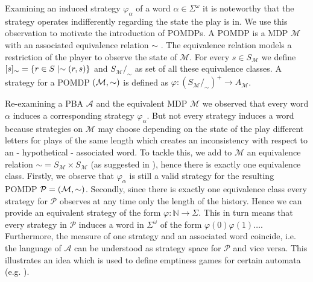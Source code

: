 Examining an induced strategy $\varphi_{\alpha}$ of a word
$\alpha\in\Sigma^{\omega}$ it is noteworthy that the strategy operates
indifferently regarding the state the play is in. We use this observation to
motivate the introduction of \acp{POMDP}. A \ac{POMDP} is a \ac{MDP}
$\mathcal{M}$ with an associated equivalence relation $\sim$
\cite{RandAutoInfTrees}. The equivalence relation models a restriction of the
player to observe the state of $\mathcal{M}$. For every
$s\in S_{\mathcal{M}}$ we define
$[s]_{\sim} = \left\{r\in S\mid \sim(r,s)\right\}$ and
$S_{\mathcal{M}}/_{\sim}$ as set of all these equivalence classes. A
strategy for a \ac{POMDP} $\left(\mathcal{M}, \sim\right)$ is defined as
$\varphi:(S_{\mathcal{M}}/_{\sim})^{+}\rightarrow A_{\mathcal{M}}$.
\begin{example}
  Re-examining a \ac{PBA} $\mathcal{A}$ and the equivalent \ac{MDP}
  $\mathcal{M}$ we observed that every word $\alpha$ induces a corresponding
  strategy $\varphi_{\alpha}$. But not every strategy induces a word because
  strategies on $\mathcal{M}$ may choose depending on the state of the play
  different letters for plays of the same length which creates an inconsistency
  with respect to an - hypothetical - associated word. To tackle this, we add
  to $\mathcal{M}$ an equivalence relation
  $\sim = S_{\mathcal{M}} \times S_{\mathcal{M}}$ (as suggested in
  \cite{DecProblemsForProbAuto}), hence there is exactly one equivalence class.
  Firstly, we observe that $\varphi_{\alpha}$ is still a valid strategy for the
  resulting \ac{POMDP} $\mathcal{P} = \left(\mathcal{M}, \sim\right)$. Secondly,
  since there is exactly one equivalence class every strategy for $\mathcal{P}$
  observes at any time only the length of the history. Hence we can provide an
  equivalent strategy of the form $\varphi:\mathbb{N}\rightarrow \Sigma$. This
  in turn means that every strategy in $\mathcal{P}$ induces a word in
  $\Sigma^{\omega}$ of the form $\varphi(0)\varphi(1)\dots$. Furthermore, the
  measure of one strategy and an associated word coincide, i.e. the language of
  $\mathcal{A}$ can be understood as strategy space for $\mathcal{P}$ and vice
  versa. This illustrates an idea which is used to define emptiness games for
  certain automata (e.g. \cite[Proposition 45]{RandAutoInfTrees}).
  \label{ex:pba}
\end{example}

